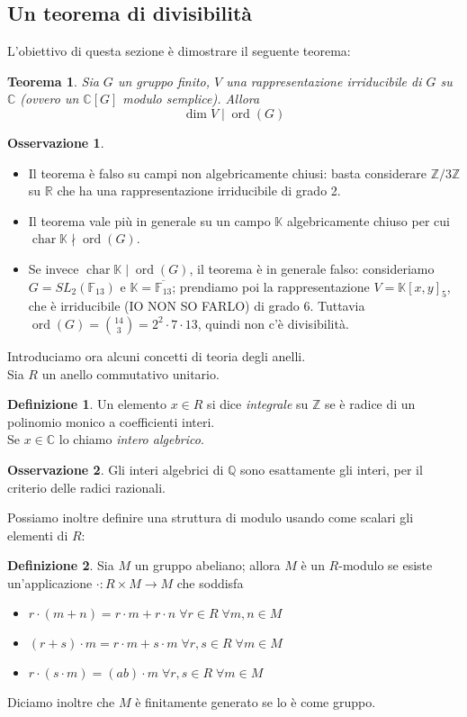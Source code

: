 \documentclass[11pt]{article}
\theoremstyle{plain}
\newtheorem{thm}{Teorema}[section]
\theoremstyle{definition}
\newtheorem{defn}{Definizione}[section]
\newtheorem*{rem}{Osservazione}
\theoremstyle{remark}
\newcommand{\C}{\mathbb{C}}
\newcommand{\R}{\mathbb{R}}
\newcommand{\K}{\mathbb{K}}
\newcommand{\Q}{\mathbb{Q}}
\newcommand{\Z}{\mathbb{Z}}
\DeclareMathOperator{\Char}{char}
\DeclareMathOperator{\ord}{ord}
\begin{document}
\subsection{Un teorema di divisibilità}
  L'obiettivo di questa sezione è dimostrare il seguente teorema:
  \begin{thm}\label{dim_mid_ordine}
    Sia $G$ un gruppo finito, $V$ una rappresentazione irriducibile di $G$ su $\C$ (ovvero un $\C[G]$ modulo semplice). Allora $$\dim V\mid  \ord(G)$$
  \end{thm}
  \begin{rem}$ $
   \begin{itemize}
    \item Il teorema è falso su campi non algebricamente chiusi: basta considerare $\Z/3\Z$ su $\R$ che ha una rappresentazione irriducibile di grado 2.
    \item Il teorema vale più in generale su un campo $\K$ algebricamente chiuso per cui $\Char \K \nmid \ord(G)$.
    \item Se invece $\Char \K\mid \ord(G)$, il teorema è in generale falso: consideriamo $G=SL_2(\mathbb F_{13})$ e $\K=\overline{\mathbb F_{13}}$; prendiamo poi la rappresentazione $V=\K[x,y]_5$, che è irriducibile (IO NON SO FARLO) di grado $6$. Tuttavia $\ord(G)=\binom{14}{3}=2^2\cdot7\cdot13$, quindi non c'è divisibilità.
   \end{itemize}
  \end{rem}
  Introduciamo ora alcuni concetti di teoria degli anelli.\\
  Sia $R$ un anello commutativo unitario.\\
  \begin{defn}
    Un elemento $x\in R$ si dice \textit{integrale} su $\Z$ se è radice di un polinomio monico a coefficienti interi.\\
    Se $x\in\C$ lo chiamo \textit{intero algebrico}.
  \end{defn}
  \begin{rem}\label{int_alg_raz}
   Gli interi algebrici di $\Q$ sono esattamente gli interi, per il criterio delle radici razionali.
  \end{rem}
  Possiamo inoltre definire una struttura di modulo usando come scalari gli elementi di $R$:
  \begin{defn}
   Sia $M$ un gruppo abeliano; allora $M$ è un $R$-modulo se esiste un'applicazione $\cdot:R\times M\to M$ che soddisfa
   \begin{itemize}
    \item $r\cdot(m+n)=r\cdot m+r\cdot n\;\forall r\in R\;\forall m,n\in M$
    \item $(r+s)\cdot m=r\cdot m+s\cdot m\;\forall r,s\in R\;\forall m\in M$
    \item $r\cdot(s\cdot m)=(ab)\cdot m\;\forall r,s\in R\;\forall m\in M$
   \end{itemize}
   Diciamo inoltre che $M$ è finitamente generato se lo è come gruppo.
  \end{defn}
\end{document}
